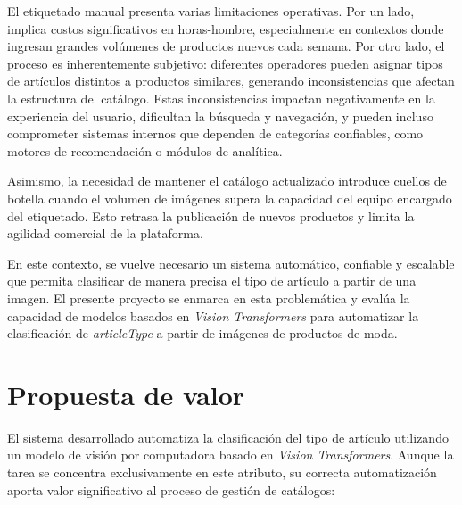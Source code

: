 El etiquetado manual presenta varias limitaciones operativas. Por un lado, implica costos significativos en horas-hombre, especialmente en contextos donde ingresan grandes volúmenes de productos nuevos cada semana. Por otro lado, el proceso es inherentemente subjetivo: diferentes operadores pueden asignar tipos de artículos distintos a productos similares, generando inconsistencias que afectan la estructura del catálogo. Estas inconsistencias impactan negativamente en la experiencia del usuario, dificultan la búsqueda y navegación, y pueden incluso comprometer sistemas internos que dependen de categorías confiables, como motores de recomendación o módulos de analítica.

Asimismo, la necesidad de mantener el catálogo actualizado introduce cuellos de botella cuando el volumen de imágenes supera la capacidad del equipo encargado del etiquetado. Esto retrasa la publicación de nuevos productos y limita la agilidad comercial de la plataforma.

En este contexto, se vuelve necesario un sistema automático, confiable y escalable que permita clasificar de manera precisa el tipo de artículo a partir de una imagen. El presente proyecto se enmarca en esta problemática y evalúa la capacidad de modelos basados en \textit{Vision Transformers} para automatizar la clasificación de \textit{articleType} a partir de imágenes de productos de moda.

\section{Propuesta de valor}

El sistema desarrollado automatiza la clasificación del tipo de artículo utilizando un modelo de visión por computadora basado en \textit{Vision Transformers}. Aunque la tarea se concentra exclusivamente en este atributo, su correcta automatización aporta valor significativo al proceso de gestión de catálogos:

